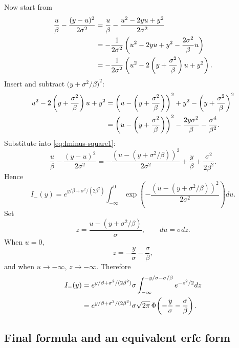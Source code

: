 \documentclass[11pt,a4paper]{article}
\newcommand{\PhiN}{\Phi}
\begin{document}
Now start from
\begin{align}
\frac{u}{\beta} - \frac{(y-u)^2}{2\sigma^2}
&=
\frac{u}{\beta} - \frac{u^2-2yu+y^2}{2\sigma^2}
\notag\\
&=
-\frac{1}{2\sigma^2}
\left(
 u^2 - 2yu + y^2 - \frac{2\sigma^2}{\beta}u
\right)
\notag\\
&=
-\frac{1}{2\sigma^2}
\left(
 u^2 - 2\left(y+\frac{\sigma^2}{\beta}\right)u + y^2
\right).
\label{eq:Iminus-square1}
\end{align}
Insert and subtract $\bigl(y+\sigma^2/\beta\bigr)^2$:
\begin{align}
u^2 - 2\left(y+\frac{\sigma^2}{\beta}\right)u + y^2
&=
\left(u-\left(y+\frac{\sigma^2}{\beta}\right)\right)^2
+
y^2 - \left(y+\frac{\sigma^2}{\beta}\right)^2
\notag\\
&=
\left(u-\left(y+\frac{\sigma^2}{\beta}\right)\right)^2
-
\frac{2y\sigma^2}{\beta} - \frac{\sigma^4}{\beta^2}.
\label{eq:Iminus-square2}
\end{align}
Substitute into \eqref{eq:Iminus-square1}:
\begin{equation}
\frac{u}{\beta} - \frac{(y-u)^2}{2\sigma^2}
=
-\frac{\left(u-(y+\sigma^2/\beta)\right)^2}{2\sigma^2}
+\frac{y}{\beta} + \frac{\sigma^2}{2\beta^2}.
\label{eq:Iminus-square3}
\end{equation}
Hence
\begin{equation}
I_-(y)
=
 e^{y/\beta+\sigma^2/(2\beta^2)}
\int_{-\infty}^{0}
\exp\!\left(-\frac{(u-(y+\sigma^2/\beta))^2}{2\sigma^2}\right)du.
\label{eq:Iminus-after-square}
\end{equation}
Set
\[
z = \frac{u-(y+\sigma^2/\beta)}{\sigma},
\qquad du = \sigma dz.
\]
When $u=0$,
\[
z = -\frac{y}{\sigma} - \frac{\sigma}{\beta},
\]
and when $u\to-\infty$, $z\to-\infty$. Therefore
\begin{align}
I_-(y)
&=
 e^{y/\beta+\sigma^2/(2\beta^2)}
\sigma \int_{-\infty}^{-y/\sigma-\sigma/\beta} e^{-z^2/2} dz
\notag\\
&=
 e^{y/\beta+\sigma^2/(2\beta^2)}
\sigma\sqrt{2\pi}\,\PhiN\!\left(-\frac{y}{\sigma}-\frac{\sigma}{\beta}\right).
\label{eq:Iminus-final}
\end{align}

\subsection{Final formula and an equivalent erfc form}
\end{document}
